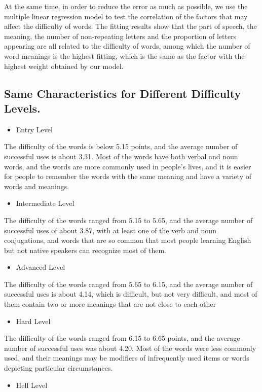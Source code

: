 \documentclass[12pt]{article}  %
\begin{document}
At the same time, in order to reduce the error as much as possible, we use the multiple linear regression model to test the correlation of the factors that may affect the difficulty of words. The fitting results show that the part of speech, the meaning, the number of non-repeating letters and the proportion of letters appearing are all related to the difficulty of words, among which the number of word meanings is the highest fitting, which is the same as the factor with the highest weight obtained by our model.
\subsection{Same Characteristics for Different Difficulty Levels.}
\begin{itemize}
	\item Entry Level
\end{itemize}
The difficulty of the words is below 5.15 points, and the average number of successful uses is about 3.31. Most of the words have both verbal and noun words, and the words are more commonly used in people's lives, and it is easier for people to remember the words with the same meaning and have a variety of words and meanings.
\begin{itemize}
	\item Intermediate Level
\end{itemize}
The difficulty of the words ranged from 5.15 to 5.65, and the average number of successful uses of about 3.87, with at least one of the verb and noun conjugations, and words that are so common that most people learning English but not native speakers can recognize most of them.
\begin{itemize}
	\item Advanced Level
\end{itemize}
The difficulty of the words ranged from 5.65 to 6.15, and the average number of successful uses is about 4.14, which is difficult, but not very difficult, and most of them contain two or more meanings that are not close to each other
\begin{itemize}
	\item Hard Level
\end{itemize}
The difficulty of the words ranged from 6.15 to 6.65 points, and the average number of successful uses was about 4.20. Most of the words were less commonly used, and their meanings may be modifiers of infrequently used items or words depicting particular circumstances.
\begin{itemize}
	\item Hell Level
\end{itemize}
\end{document}
